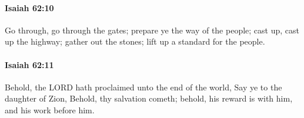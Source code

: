 		\paragraph{Isaiah 62:10} %
			\label{ISAIAH-62-10}

			Go through, go through the gates; prepare ye the way of the people; cast up, cast up the highway; gather out the stones; lift up a standard for the people.


		\paragraph{Isaiah 62:11} %
			\label{ISAIAH-62-11}

			Behold, the LORD hath proclaimed unto the end of the world, Say ye to the daughter of Zion, Behold, thy salvation cometh; behold, his reward is with him, and his work before him.


